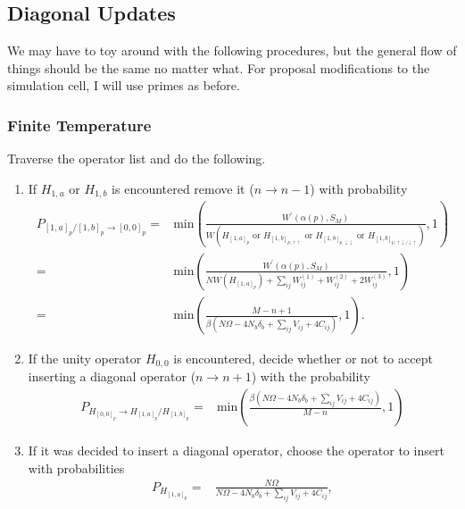\documentclass[12pt]{article}
\begin{document}
\subsection{Diagonal Updates}

We may have to toy around with the following procedures, but the general flow of things should be the same no matter what.
For proposal modifications to the simulation cell, I will use primes as before.

\subsubsection{Finite Temperature}

Traverse the operator list and do the following.

\begin{enumerate}
    \item If $H_{1,a}$ or $H_{1,b}$ is encountered remove it ($n \rightarrow n - 1$) with probability
    \begin{align*}
        P_{[1,a]_p / [1,b]_p \rightarrow [0,0]_p} =& \mathrm{min}\left( \frac{W^\prime(\alpha(p), S_M)}{ W(H_{[1,a]_p} \text{ or } H_{[1,b]_{p,\uparrow\uparrow}} \text{ or } H_{[1,b]_{p,\downarrow\downarrow}} \text{ or } H_{[1,b]_{p,\uparrow\downarrow / \downarrow\uparrow}}) }, 1 \right) \\
        =& \mathrm{min}\left( \frac{W^\prime(\alpha(p), S_M)}{NW(H_{[1,a]_p}) + \sum_{ij} W_{ij}^{(1)} + W_{ij}^{(2)} + 2W_{ij}^{(3)} }, 1 \right) \\
        =& \mathrm{min}\left(\frac{M-n+1}{\beta \left(N\Omega - 4N_b\delta_b + \sum_{ij} V_{ij} + 4C_{ij}\right) },1\right).
    \end{align*}
    \item If the unity operator $H_{0,0}$ is encountered, decide whether or not to accept inserting a diagonal operator ($n \rightarrow n + 1$) with the probability 
    \begin{align}
        P_{H_{[0,0]_p} \rightarrow H_{[1,a]_p} / H_{[1,b]_p}} =& \mathrm{min}\left(\frac{\beta \left(N\Omega - 4N_b\delta_b + \sum_{ij} V_{ij} + 4C_{ij}\right) }{M-n},1\right)
    \end{align}
    \item If it was decided to insert a diagonal operator, choose the operator to insert with probabilities
    \begin{subequations} \label{eq:heat_bath_1_ryd}
        \begin{align} 
            P_{H_{[1,a]_p}} = & \frac{N\Omega}{N\Omega - 4N_b\delta_b + \sum_{ij} V_{ij} + 4C_{ij}}, \\

\end{align}
\end{subequations}
\end{enumerate}
\end{document}
